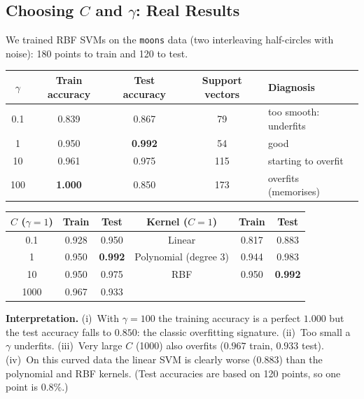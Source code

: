 \subsection{Choosing $C$ and $\gamma$: Real Results}

We trained RBF SVMs on the \texttt{moons} data (two interleaving half-circles with noise): 180 points to train and 120 to test.

\begin{center}
\begin{tabular}{@{}ccccl@{}}
\toprule
\textbf{$\gamma$} & \textbf{Train accuracy} & \textbf{Test accuracy} & \textbf{Support vectors} & \textbf{Diagnosis}\\
\midrule
0.1 & 0.839 & 0.867 & 79 & too smooth: underfits\\
1 & 0.950 & \textbf{0.992} & 54 & good\\
10 & 0.961 & 0.975 & 115 & starting to overfit\\
100 & \textbf{1.000} & 0.850 & 173 & overfits (memorises)\\
\bottomrule
\end{tabular}
\end{center}

\begin{center}
\begin{tabular}{@{}ccc@{\qquad\qquad}ccc@{}}
\toprule
\textbf{$C$} ($\gamma=1$) & \textbf{Train} & \textbf{Test} & \textbf{Kernel} ($C=1$) & \textbf{Train} & \textbf{Test}\\
\midrule
0.1 & 0.928 & 0.950 & Linear & 0.817 & 0.883\\
1 & 0.950 & \textbf{0.992} & Polynomial (degree 3) & 0.944 & 0.983\\
10 & 0.950 & 0.975 & RBF & 0.950 & \textbf{0.992}\\
1000 & 0.967 & 0.933 & & &\\
\bottomrule
\end{tabular}
\end{center}

\textbf{Interpretation.} (i)~With $\gamma=100$ the training accuracy is a perfect $1.000$ but the test accuracy falls to $0.850$: the classic overfitting signature. (ii)~Too small a $\gamma$ underfits. (iii)~Very large $C$ (1000) also overfits ($0.967$ train, $0.933$ test). (iv)~On this curved data the linear SVM is clearly worse ($0.883$) than the polynomial and RBF kernels. (Test accuracies are based on 120 points, so one point is $0.8\%$.)


